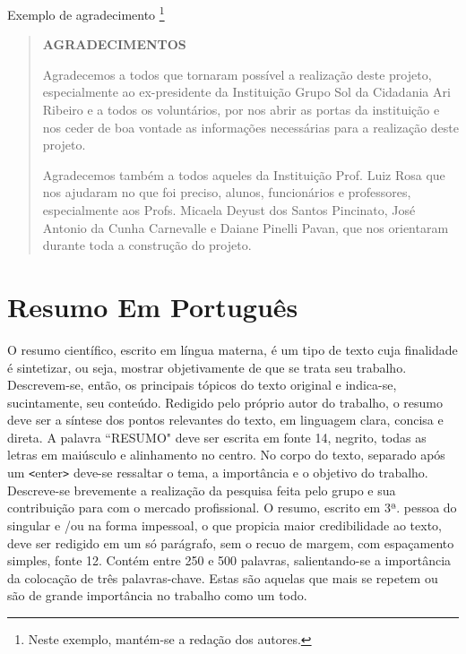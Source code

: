 \documentclass[
	12pt,				%
	openright,			%
	oneside,			%
	a4paper,			%
	english,			%
	french,				%
	spanish,			%
	brazil				%
	]{abntex2}
\begin{document}
\par Exemplo de agradecimento \footnote{Neste exemplo, mantém-se a redação dos autores.}

\begin{quote}
\begin{center}
\textbf{AGRADECIMENTOS}
\end{center}
\par Agradecemos a todos que tornaram possível a realização deste projeto, especialmente ao ex-presidente da Instituição Grupo Sol da Cidadania Ari Ribeiro e a todos os voluntários, por nos abrir as portas da instituição e nos ceder de boa vontade as informações necessárias para a realização deste projeto.
\par Agradecemos também a todos aqueles da Instituição Prof. Luiz Rosa que nos ajudaram no que foi preciso, alunos, funcionários e professores, especialmente aos Profs. Micaela Deyust dos Santos Pincinato, José Antonio da Cunha Carnevalle e Daiane Pinelli Pavan, que nos orientaram durante toda a construção do projeto. 

\end{quote}

\section{Resumo Em Português}
\par O resumo científico, escrito em língua materna, é um tipo de texto cuja finalidade é sintetizar, ou seja, mostrar objetivamente de que se trata seu trabalho. Descrevem-se, então, os principais tópicos do texto original e indica-se, sucintamente, seu conteúdo. Redigido pelo próprio autor do trabalho, o resumo deve ser a síntese dos pontos relevantes do texto, em linguagem clara, concisa e direta. A palavra ``RESUMO" deve ser escrita em fonte 14, negrito, todas as letras em maiúsculo e alinhamento no centro. No corpo do texto, separado após um \verb*#<#enter\verb*#># deve-se ressaltar o tema, a importância e o objetivo do trabalho. Descreve-se brevemente a realização da pesquisa feita pelo grupo e sua contribuição para com o mercado profissional. O resumo, escrito em 3ª. pessoa do singular e /ou na forma impessoal, o que propicia maior credibilidade ao texto, deve ser redigido em um só parágrafo, sem o recuo de margem, com espaçamento simples, fonte 12. Contém entre 250 e 500 palavras, salientando-se a importância da colocação de três palavras-chave. Estas são aquelas que mais se repetem ou são de grande importância no trabalho como um todo. 
\end{document}
